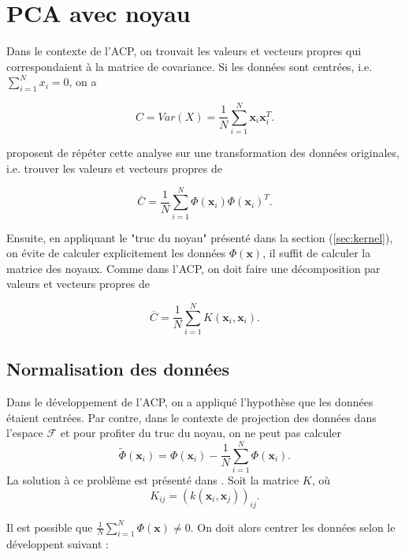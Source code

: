 \section{PCA avec noyau}

Dans le contexte de l'ACP, on trouvait les valeurs et vecteurs propres qui correspondaient à la matrice de covariance. Si les données sont centrées, i.e. $\sum_{i = 1}^{N}x_i = 0$, on a 

\begin{equation*}
C = Var(X) = \frac{1}{N} \sum_{i = 1}^N \textbf{x}_i \textbf{x}_i^T.
\end{equation*}

\cite{scholkopf1997kernel} proposent de répéter cette analyse sur une transformation des données originales, i.e. trouver les valeurs et vecteurs propres de

\begin{equation}\label{eq:covkernel}
\overline{C} = \frac{1}{N} \sum_{i = 1}^{N} \Phi(\textbf{x}_i)\Phi(\textbf{x}_i)^T.
\end{equation}

Ensuite, en appliquant le "truc du noyau" présenté dans la section (\ref{sec:kernel}), on évite de calculer explicitement les données $\Phi(\textbf{x})$, il suffit de calculer la matrice des noyaux. Comme dans l'ACP, on doit faire une décomposition par valeurs et vecteurs propres de 

\begin{equation}\label{eq:covkernel}
\overline{C} = \frac{1}{N} \sum_{i = 1}^{N} K(\textbf{x}_i, \textbf{x}_i).
\end{equation}

\subsection{Normalisation des données}

Dans le développement de l'ACP, on a appliqué l'hypothèse que les données étaient centrées. Par contre, dans le contexte de projection des données dans l'espace $\mathcal{F}$ et pour profiter du truc du noyau, on ne peut pas calculer $$\tilde{\Phi}(\textbf{x}_i) = \Phi(\textbf{x}_i) - \frac{1}{N}\sum_{i = 1}^{N}\Phi(\textbf{x}_i).$$ La solution à ce problème est présenté dans \cite{scholkopf1998nonlinear}. Soit la matrice $K$, où 
$$K_{ij} = (k(\textbf{x}_i, \textbf{x}_j))_{ij}.$$

Il est possible que $\frac{1}{N} \sum_{i = 1}^{N} \Phi(\textbf{x}) \neq 0$. On doit alors centrer les données selon le développent suivant : 

